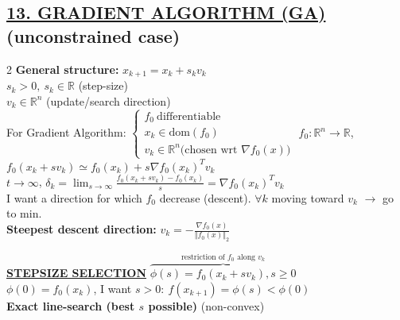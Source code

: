 \documentclass[a4paper]{article}
\begin{document}
\subsection*{\color{cyan}
\textsf{
    \underline{13. GRADIENT ALGORITHM (GA)} (\textsf{unconstrained case})}}
\vspace{-0.3cm}
\begin{multicols}{2}
    \noindent
    \textbf{General structure: } $x_{k+1}=x_k + s_k{v_k}$\\
    $s_k>0, \ s_k \in \mathbb{R}$ (step-size)\\
    $v_k\in\mathbb{R}^n$ (update/search direction)\\
    For Gradient Algorithm: $\begin{cases}
        f_0 \ \text{differentiable}\\
        x_k \in \text{dom}(f_0)\\
        v_k \in \mathbb{R}^n \text{(chosen wrt $\nabla{f_0(x)}$)} 
    \end{cases}$
    $f_0:\mathbb{R}^n\to\mathbb{R}$, $f_0(x_k+s{v_k})\simeq{f_0(x_k)}+s\nabla{f_0(x_k)}^T{v_k}$\\
    $t\to\infty$, $\delta_k=\lim_{s\to\infty}{\frac{f_0(x_k+sv_k)-f_0(x_k)}{s}}=\nabla{f_0}(x_k)^T{v_k}$\\
    I want a direction for which $f_0$ decrease (descent). $\forall{k}$ moving toward $v_k$ $\to$ go to min.\\
    \textbf{Steepest descent direction:} $v_k=-\frac{\nabla{f_0}(x)}{\Vert f_0(x) \Vert_2}$
    \begin{algorithm}[H]
        \caption{Gradient Algorithm}
        \begin{algorithmic}[1]
            \Else 
            \EndIf
        \end{algorithmic}
    \end{algorithm}
    \vspace{-0.3cm}
    \noindent
    \textbf{\underline{STEPSIZE SELECTION}} $\overbrace{\phi(s)=f_0(x_k+s{v_k}), s\ge0}^{\text{restriction of $f_0$ along $v_k$}}$\\
    $\phi(0)=f_0(x_k)$, I want $s>0: \ f(x_{k+1})=\phi(s)<\phi(0)$\\
    \textbf{Exact line-search (best $s$ possible)} (non-convex)

\end{multicols}
\end{document}
